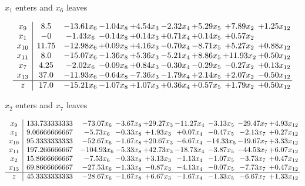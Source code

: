 \documentclass[8pt]{article}
\begin{document}
 $ x_{1} $ enters and $ x_{6} $ leaves 

 \[\begin{array}{c| c c@{\hskip 2pt} c@{\hskip 2pt} c@{\hskip 2pt} c@{\hskip 2pt} c@{\hskip 2pt} c@{\hskip 2pt} c@{\hskip 2pt} }
 x_{9}   &  8.5 & -13.61 x_{6} & -1.04 x_{8} & +  4.54 x_{3} & -2.32 x_{4} & +  5.29 x_{5} & +  7.89 x_{2} & +  1.25 x_{12}\\
 x_{1}   &  -0 & -1.43 x_{6} & -0.14 x_{8} & +  0.14 x_{3} & +  0.71 x_{4} & +  0.14 x_{5} & +  0.57 x_{2} &   \\
 x_{10}   &  11.75 & -12.98 x_{6} & +  0.09 x_{8} & +  4.16 x_{3} & -0.70 x_{4} & -8.71 x_{5} & +  5.27 x_{2} & +  0.88 x_{12}\\
 x_{11}   &  8.0 & -15.07 x_{6} & -1.36 x_{8} & +  5.36 x_{3} & -5.21 x_{4} & +  8.86 x_{5} & + 11.93 x_{2} & +  0.50 x_{12}\\
 x_{7}   &  4.25 & -2.02 x_{6} & -0.09 x_{8} & +  0.84 x_{3} & -0.30 x_{4} & -0.29 x_{5} & -0.27 x_{2} & +  0.13 x_{12}\\
 x_{13}   &  37.0 & -11.93 x_{6} & -0.64 x_{8} & -7.36 x_{3} & -1.79 x_{4} & +  2.14 x_{5} & +  2.07 x_{2} & -0.50 x_{12}\\
\hline
z    &  17.0 & -15.21 x_{6} & -1.07 x_{8} & +  1.07 x_{3} & +  0.36 x_{4} & +  0.57 x_{5} & +  1.79 x_{2} & +  0.50 x_{12}\\
\end{array}\]


 $ x_{2} $ enters and $ x_{7} $ leaves 

 \[\begin{array}{c| c c@{\hskip 2pt} c@{\hskip 2pt} c@{\hskip 2pt} c@{\hskip 2pt} c@{\hskip 2pt} c@{\hskip 2pt} c@{\hskip 2pt} }
 x_{9}   &  133.733333333 & -73.07 x_{6} & -3.67 x_{8} & + 29.27 x_{3} & -11.27 x_{4} & -3.13 x_{5} & -29.47 x_{7} & +  4.93 x_{12}\\
 x_{1}   &  9.06666666667 & -5.73 x_{6} & -0.33 x_{8} & +  1.93 x_{3} & +  0.07 x_{4} & -0.47 x_{5} & -2.13 x_{7} & +  0.27 x_{12}\\
 x_{10}   &  95.3333333333 & -52.67 x_{6} & -1.67 x_{8} & + 20.67 x_{3} & -6.67 x_{4} & -14.33 x_{5} & -19.67 x_{7} & +  3.33 x_{12}\\
 x_{11}   &  197.266666667 & -104.93 x_{6} & -5.33 x_{8} & + 42.73 x_{3} & -18.73 x_{4} & -3.87 x_{5} & -44.53 x_{7} & +  6.07 x_{12}\\
 x_{2}   &  15.8666666667 & -7.53 x_{6} & -0.33 x_{8} & +  3.13 x_{3} & -1.13 x_{4} & -1.07 x_{5} & -3.73 x_{7} & +  0.47 x_{12}\\
 x_{13}   &  69.8666666667 & -27.53 x_{6} & -1.33 x_{8} & -0.87 x_{3} & -4.13 x_{4} & -0.07 x_{5} & -7.73 x_{7} & +  0.47 x_{12}\\
\hline
z    &  45.3333333333 & -28.67 x_{6} & -1.67 x_{8} & +  6.67 x_{3} & -1.67 x_{4} & -1.33 x_{5} & -6.67 x_{7} & +  1.33 x_{12}\\
\end{array}\]
\end{document}
